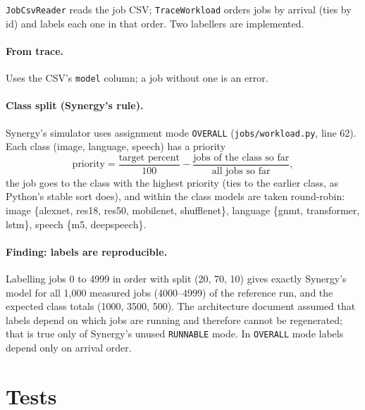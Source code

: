 \documentclass[11pt,a4paper]{article}
\newcommand{\code}[1]{\texttt{#1}}
\begin{document}
\code{JobCsvReader} reads the job CSV; \code{TraceWorkload} orders jobs by arrival (ties by id) and
labels each one in that order. Two labellers are implemented.

\paragraph{From trace.} Uses the CSV's \code{model} column; a job without one is an error.

\paragraph{Class split (Synergy's rule).} Synergy's simulator uses assignment mode \code{OVERALL}
(\code{jobs/workload.py}, line 62). Each class (image, language, speech) has a priority
\[
  \text{priority} = \frac{\text{target percent}}{100} - \frac{\text{jobs of the class so far}}{\text{all jobs so far}},
\]
the job goes to the class with the highest priority (ties to the earlier class, as Python's stable
sort does), and within the class models are taken round-robin: image \{alexnet, res18, res50,
mobilenet, shufflenet\}, language \{gnmt, transformer, lstm\}, speech \{m5, deepspeech\}.

\paragraph{Finding: labels are reproducible.} Labelling jobs 0 to 4999 in order with split
(20, 70, 10) gives exactly Synergy's model for all 1,000 measured jobs (4000--4999) of the reference
run, and the expected class totals (1000, 3500, 500). The architecture document assumed that labels
depend on which jobs are running and therefore cannot be regenerated; that is true only of Synergy's
unused \code{RUNNABLE} mode. In \code{OVERALL} mode labels depend only on arrival order.

\section{Tests}
\end{document}
